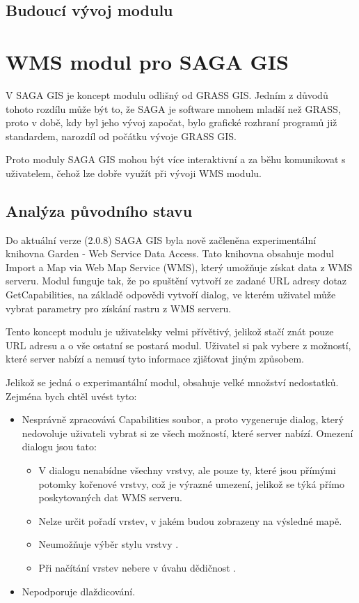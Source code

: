 \documentclass[a4paper,12pt]{article}
\begin{document}
\subsection{Budoucí vývoj modulu}

\newpage

\section{ WMS modul pro SAGA GIS}

V SAGA GIS je koncept modulu odlišný od GRASS GIS. Jedním z důvodů tohoto rozdílu může být to, že SAGA je software mnohem mladší než GRASS, proto v době, kdy byl jeho vývoj započat, bylo grafické rozhraní programů již standardem, narozdíl 
 od počátku vývoje GRASS GIS. 

Proto moduly SAGA GIS mohou být více interaktivní a za běhu komunikovat s uživatelem, čehož lze dobře využít při vývoji WMS modulu.

\subsection{Analýza původního stavu}

Do aktuální verze (2.0.8) SAGA GIS byla nově začleněna experimentální knihovna Garden - Web Service Data Access. Tato knihovna obsahuje modul Import a Map via Web Map Service (WMS), který umožňuje získat data z WMS serveru.
Modul funguje tak, že po spuštění vytvoří ze zadané URL adresy dotaz GetCapabilities, na základě odpovědi vytvoří dialog, ve kterém uživatel může vybrat parametry pro získání rastru z WMS serveru. 

Tento koncept modulu je uživatelsky velmi přívětivý, jelikož stačí znát pouze URL adresu a o vše ostatní se postará modul. Uživatel si pak vybere z možností, které server nabízí a nemusí tyto informace zjišťovat jiným způsobem. 


Jelikož se jedná o experimantální modul, obsahuje velké množství nedostatků. Zejména bych chtěl uvést tyto:

\begin{itemize}
\item Nesprávně zpracovává Capabilities soubor, a proto vygeneruje dialog, který nedovoluje uživateli vybrat si ze všech možností, které server nabízí. Omezení dialogu jsou tato:
\begin{itemize}
 \item     V dialogu nenabídne všechny vrstvy, ale pouze ty, které jsou přímými potomky kořenové vrstvy, což je výrazné umezení, jelikož se týká přímo poskytovaných dat WMS serveru.
 \item 	   Nelze určit pořadí vrstev, v jakém budou  zobrazeny na výsledné mapě.
 \item 	   Neumožňuje výběr stylu vrstvy .
 \item 	   Při načítání vrstev nebere v úvahu dědičnost	  . 
\end{itemize}
\item Nepodporuje dlaždicování. 
\end{itemize}
\end{document}
